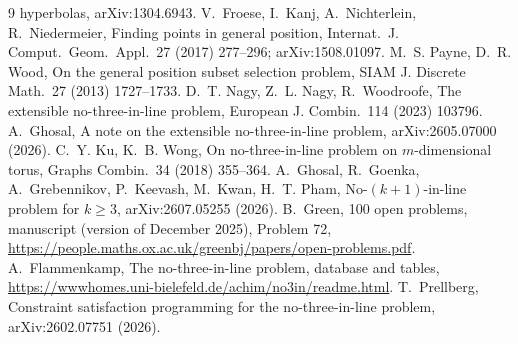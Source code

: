\documentclass[11pt]{article}
\theoremstyle{remark}
\begin{document}
\begin{thebibliography}{9}
 hyperbolas, arXiv:1304.6943.
 V.~Froese, I.~Kanj, A.~Nichterlein, R.~Niedermeier, Finding points in general position, Internat.\ J.
 Comput.\ Geom.\ Appl.\ 27 (2017) 277--296; arXiv:1508.01097.
 M.~S. Payne, D.~R. Wood, On the general position subset selection problem, SIAM J. Discrete Math.\ 27 (2013)
 1727--1733.
 D.~T. Nagy, Z.~L. Nagy, R.~Woodroofe, The extensible no-three-in-line problem, European J. Combin.\ 114
 (2023) 103796.
 A.~Ghosal, A note on the extensible no-three-in-line problem, arXiv:2605.07000 (2026).
 C.~Y. Ku, K.~B. Wong, On no-three-in-line problem on $m$-dimensional torus, Graphs Combin.\ 34 (2018)
 355--364.
 A.~Ghosal, R.~Goenka, A.~Grebennikov, P.~Keevash, M.~Kwan, H.~T. Pham, No-$(k+1)$-in-line problem for
 $k\ge3$, arXiv:2607.05255 (2026).
 B.~Green, 100 open problems, manuscript (version of December 2025), Problem 72, \url{https://people.maths.ox.ac.uk/greenbj/papers/open-problems.pdf}.
 A.~Flammenkamp, The no-three-in-line problem, database and tables,
 \url{https://wwwhomes.uni-bielefeld.de/achim/no3in/readme.html}.
 T.~Prellberg, Constraint satisfaction programming for the no-three-in-line problem, arXiv:2602.07751
 (2026).
\end{thebibliography}
\end{document}
